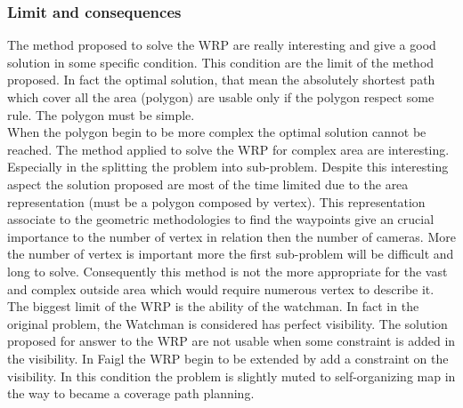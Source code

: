 


\subsubsection{Limit and consequences}

The method proposed to solve the WRP are really interesting and give a good solution in some specific condition. This condition are the limit of the method proposed. In fact the optimal solution, that mean the absolutely shortest path which cover all the area (polygon) are usable only if the polygon respect some rule. The polygon must be simple.  \\
When the polygon begin to be more complex the optimal solution cannot be reached. The method applied to solve the WRP for complex area are interesting. Especially in the splitting the problem into sub-problem. Despite this interesting aspect the solution proposed are most of the time limited due to the area representation (must be a polygon composed by vertex). This representation associate to the geometric methodologies to find the waypoints give an crucial importance to the number of vertex in relation then the number of cameras. More the number of vertex is important more the first sub-problem will be difficult and long to solve. 
Consequently this method is not the more appropriate for the vast and complex outside area which would require  numerous vertex to describe it.
 The biggest limit of the WRP is the ability of the watchman. In fact in the original problem, the Watchman is considered has perfect visibility. The solution proposed for answer to the WRP are not usable when some constraint is added in the visibility. 
In Faigl \citep{235*faigl2010} the WRP begin to be extended by add a constraint on the visibility. In this condition the problem is slightly muted to self-organizing map in the way to became a coverage path planning.

